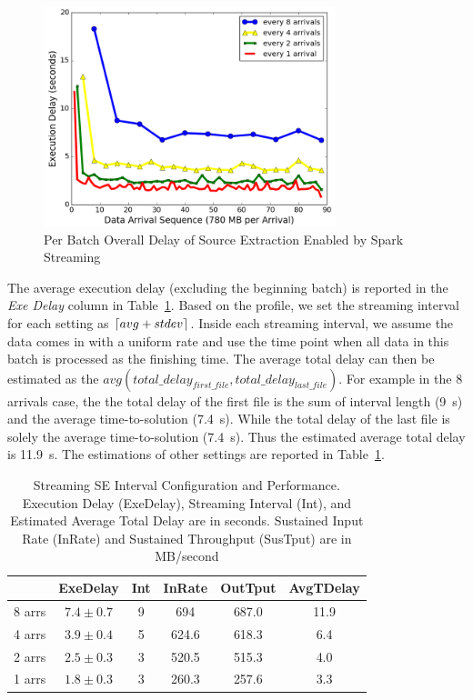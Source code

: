 \documentclass[10pt,journal,compsoc]{IEEEtran}
\DeclarePairedDelimiter{\ceil}{\lceil}{\rceil}
\begin{document}
\begin{figure}[h]
	\begin{center}
		\includegraphics[width=85mm]{pictures/stream}
		\caption{Per Batch Overall Delay of Source Extraction Enabled by Spark Streaming
		\label{fig:stream}}
  	\end{center}
\end{figure}

The average execution delay (excluding the beginning batch) is reported in the {\it Exe Delay} column in Table~\ref{tb:stream}.
Based on the profile, we set the streaming interval for each setting as $\ceil{avg+stdev}$.
Inside each streaming interval, we assume the data comes in with a uniform rate and use the time point
when all data in this batch is processed as the finishing time.
The average total delay can then be estimated as the $avg(total\_delay_{first\_file}, total\_delay_{last\_file})$.
For example in the 8 arrivals case, the the total delay of the first file is the sum of interval length (9~s) and 
the average time-to-solution (7.4~s). While the total delay of the last file is solely the average time-to-solution (7.4~s).
Thus the estimated average total delay is 11.9~s. The estimations of other settings are reported in Table~\ref{tb:stream}.
\begin{table}[h]
  \begin{center}
  \caption{Streaming SE Interval Configuration and Performance. Execution Delay (ExeDelay), Streaming Interval (Int), 
  and Estimated Average Total Delay are in seconds. 
  Sustained Input Rate (InRate) and Sustained Throughput (SusTput) are in MB/second}
    \begin{small}
    \begin{tabular}{ | c | c | c | c | c | c |}
    \hline
     & ExeDelay & Int  & InRate & OutTput & AvgTDelay\\ \hline \hline
    8 arrs & $7.4\pm0.7$ & 9 & 694 & 687.0 & 11.9\\ \hline
    4 arrs & $3.9\pm0.4$ & 5 & 624.6 & 618.3 & 6.4\\ \hline  
    2 arrs & $2.5\pm0.3$ & 3 & 520.5 & 515.3 & 4.0\\ \hline
    1 arrs & $1.8\pm0.3$ & 3 & 260.3 & 257.6 & 3.3\\ \hline
    \end{tabular}
    \end{small}   
  \label{tb:stream}     	
  \end{center}
\end{table}
\end{document}
